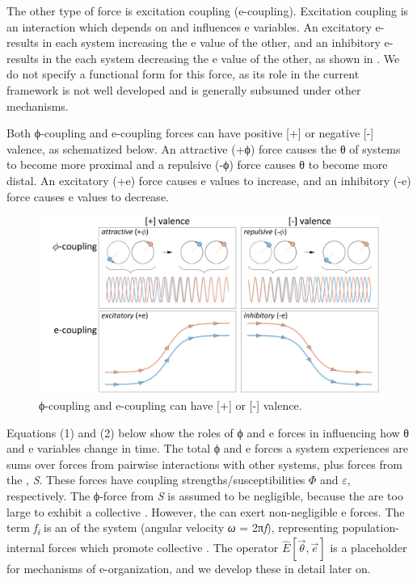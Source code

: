   The other type of force is excitation coupling (e-coupling). Excitation coupling is an interaction which depends on and influences e variables. An excitatory e- results in each system increasing the e value of the other, and an inhibitory e- results in the each system decreasing the e value of the other, as shown in {}. We do not specify a functional form for this force, as its role in the current framework is not well developed and is generally subsumed under other mechanisms.

  Both ϕ-coupling and e-coupling forces can have positive [+] or negative [-] valence, as schematized below. An attractive (+ϕ) force causes the θ of systems to become more proximal and a repulsive (-ϕ) force causes θ to become more distal. An excitatory (+e) force causes e values to increase, and an inhibitory (-e) force causes e values to decrease. 

  
\begin{figure}
\includegraphics[width=\textwidth]{figures/Tilsen-img20.png}
\caption{ϕ-coupling and e-coupling can have [+] or [-] valence.}
\label{fig:2:13}
\end{figure}
 

  Equations (1) and (2) below show the roles of ϕ and e forces in influencing how θ and e variables change in time. The total ϕ and e forces a system experiences are sums over forces from pairwise interactions with other systems, plus forces from the , \textit{S}. These forces have coupling strengths/susceptibilities $\Phi$ and $\varepsilon $, respectively. The ϕ-force from \textit{S} is assumed to be negligible, because the  are too large to exhibit a collective . However, the  can exert non-negligible e forces. The term \textit{f\textsubscript{i}} is an  of the system (angular velocity \textit{ω} = 2π\textit{f}), representing population-internal forces which promote collective . The operator  $\widehat {{E}}\left[\overrightarrow{{\theta}} ,\overrightarrow{{e}}\right]$ is a placeholder for mechanisms of e-organization, and we develop these in detail later on.

